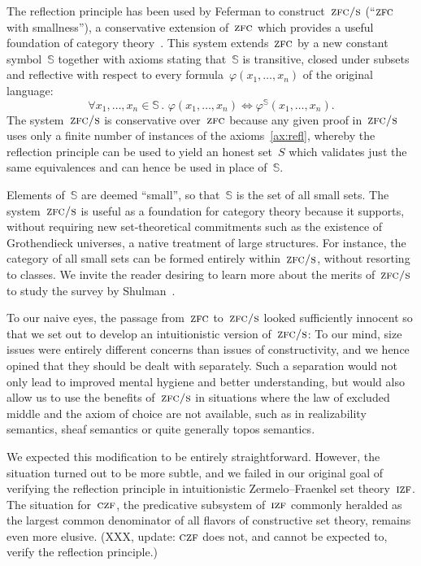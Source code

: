 \documentclass[oneside,reqno]{amsart}
\theoremstyle{definition}
\theoremstyle{plain}
\theoremstyle{remark}
\renewcommand{\SS}{\mathbb{S}}
\renewcommand{\_}{\mathpunct{.}\,}
\newcommand{\?}{\,{:}\,}
\newcommand{\IZF}{\textsc{izf}}
\newcommand{\CZF}{\textsc{czf}}
\newcommand{\ZFC}{\textsc{zfc}}
\newcommand{\ZFCS}{\textsc{zfc/s}}
\begin{document}
The reflection principle has been used by Feferman to construct~$\ZFCS$ (``$\ZFC$ with
smallness''), a conservative extension of~$\ZFC$ which provides a useful
foundation of category theory~\cite{feferman:zfcs}. This system extends~$\ZFC$
by a new constant symbol~$\SS$ together with axioms stating
that~$\SS$ is transitive, closed under subsets and reflective with respect to
every formula~$\varphi(x_1,\ldots,x_n)$ of the original language:
\[ \label{ax:refl}\tag{$\star$}
\forall x_1,\ldots,x_n \in \SS\_ \varphi(x_1,\ldots,x_n) \Leftrightarrow
\varphi^{\SS}(x_1,\ldots,x_n). \]
The system~$\ZFCS$ is conservative over~$\ZFC$ because any given proof in~$\ZFCS$ uses
only a finite number of instances of the axioms~\eqref{ax:refl}, whereby the reflection
principle can be used to yield an honest set~$S$ which validates just the same equivalences
and can hence be used in place of~$\SS$.

Elements of~$\SS$ are deemed ``small'', so that~$\SS$ is the set of all small
sets. The system~$\ZFCS$ is useful as a foundation for category theory because
it supports, without requiring new set-theoretical commitments such as the
existence of Grothendieck universes, a native treatment of large structures.
For instance, the category of all small sets can be formed entirely
within~$\ZFCS$, without resorting to classes. We invite the reader desiring
to learn more about the merits of~$\ZFCS$ to study the survey by
Shulman~\cite[Section~11]{shulman:sets}.

To our naive eyes, the passage from~$\ZFC$ to~$\ZFCS$ looked sufficiently
innocent so that we set out to develop an intuitionistic version of~$\ZFCS$: To
our mind, size issues were entirely different concerns than issues of constructivity, and
we hence opined that they should be dealt with separately. Such a separation
would not only lead to improved mental hygiene and better understanding, but
would also allow us to use the benefits
of~$\ZFCS$ in situations where the law of excluded middle and the axiom of
choice are not available, such as in realizability semantics, sheaf semantics
or quite generally topos semantics.

We expected this modification to be entirely straightforward. However, the
situation turned out to be more subtle, and we failed in our original goal of
verifying the reflection principle in intuitionistic Zermelo--Fraenkel set
theory~$\IZF$. The situation for~$\CZF$, the predicative subsystem of~$\IZF$
commonly heralded as the largest common denominator of all flavors of
constructive set theory, remains even more elusive. (XXX, update: $\CZF$ does
not, and cannot be expected to, verify the reflection principle.)
\end{document}
